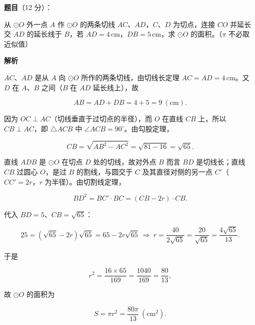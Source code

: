 \begin{answer}

\textbf{题目}（12 分）：

从 $\odot O$ 外一点 $A$ 作 $\odot O$ 的两条切线 $AC\text{、}AD$，$C\text{、}D$ 为切点，连接 $CO$ 并延长交 $AD$ 的延长线于 $B$，若 $AD=4\,\mathrm{cm}$，$DB=5\,\mathrm{cm}$，求 $\odot O$ 的面积。（$\pi$ 不必取近似值）
\nopagebreak[4]
\begin{center}\end{center}
\nopagebreak[4]
\textbf{解析}

$AC\text{、}AD$ 是从 $A$ 向 $\odot O$ 所作的两条切线，由切线长定理 $AC=AD=4\,\mathrm{cm}$。又 $D$ 在 $A\text{、}B$ 之间（$B$ 在 $AD$ 延长线上），故

\nopagebreak[4]
\[
AB=AD+DB=4+5=9\ (\mathrm{cm}).
\]

因为 $OC\perp AC$（切线垂直于过切点的半径），而 $O$ 在直线 $CB$ 上，所以 $CB\perp AC$，即 $\triangle ACB$ 中 $\angle ACB=90^\circ$。由勾股定理，

\nopagebreak[4]
\[
CB=\sqrt{AB^2-AC^2}=\sqrt{81-16}=\sqrt{65}.
\]

直线 $ADB$ 是 $\odot O$ 在切点 $D$ 处的切线，故对外点 $B$ 而言 $BD$ 是切线长；直线 $CB$ 过圆心 $O$，是过 $B$ 的割线，与圆交于 $C$ 及其直径对侧的另一点 $C'$（$CC'=2r$，$r$ 为半径）。由切割线定理，

\nopagebreak[4]
\[
BD^2=BC'\cdot BC=(CB-2r)\cdot CB.
\]

代入 $BD=5$、$CB=\sqrt{65}$：

\nopagebreak[4]
\[
25=(\sqrt{65}-2r)\sqrt{65}=65-2r\sqrt{65}\ \Longrightarrow\ r=\frac{40}{2\sqrt{65}}=\frac{20}{\sqrt{65}}=\frac{4\sqrt{65}}{13}.
\]

于是

\nopagebreak[4]
\[
r^2=\frac{16\times65}{169}=\frac{1040}{169}=\frac{80}{13},
\]

故 $\odot O$ 的面积为

\nopagebreak[4]
\[
S=\pi r^2=\frac{80\pi}{13}\ (\mathrm{cm^2}).
\]


\end{answer}
